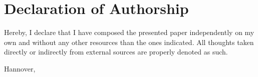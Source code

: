 \chapter*{Declaration of Authorship}
\thispagestyle{empty}

Hereby, I declare that I have composed the presented paper independently on my own and without any other resources than the ones indicated. All thoughts taken directly or indirectly from external sources are properly denoted as such.

\vfill

\begin{flushleft}
  Hannover, \submissiondate\\
  \vspace*{2em}
  \thesisauthor
\end{flushleft}
